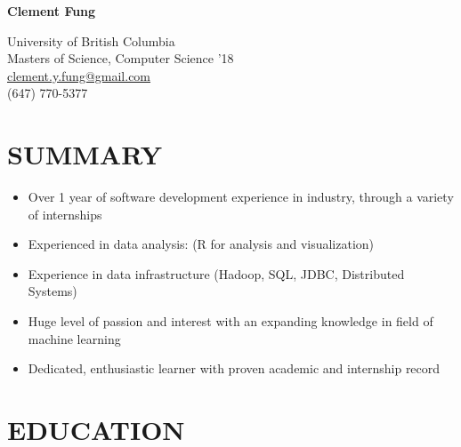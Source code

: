 \documentclass[10pt]{res} %
\begin{document}

{\huge \bf Clement Fung} \hfill 

University of British Columbia \\
Masters of Science, Computer Science '18 \\
\href{mailto:clement.y.fung@gmail.com}{\underline{clement.y.fung@gmail.com}} \\ 
(647) 770-5377 


\begin{resume}


\section{SUMMARY}

\vspace{0.2in} %

\begin{itemize}
    \item Over 1 year of software development experience in industry, through a variety of internships
    \item Experienced in data analysis: (R for analysis and visualization) 
    \item Experience in data infrastructure (Hadoop, SQL, JDBC, Distributed Systems)
    \item Huge level of passion and interest with an expanding knowledge in field of machine learning 
    \item Dedicated, enthusiastic learner with proven academic and internship record
\end{itemize}


\section{EDUCATION} 


\end{resume}
\end{document}
